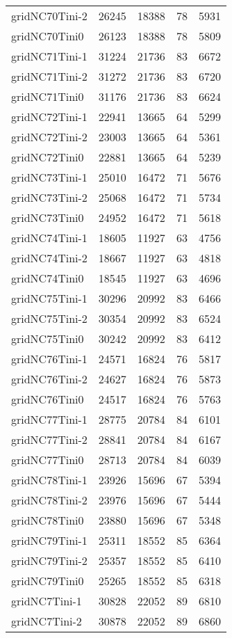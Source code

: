 \begin{longtable}{lrrrr}
gridNC70Tini-2 & 26245 & 18388 & 78 & 5931 \\
gridNC70Tini0 & 26123 & 18388 & 78 & 5809 \\
gridNC71Tini-1 & 31224 & 21736 & 83 & 6672 \\
gridNC71Tini-2 & 31272 & 21736 & 83 & 6720 \\
gridNC71Tini0 & 31176 & 21736 & 83 & 6624 \\
gridNC72Tini-1 & 22941 & 13665 & 64 & 5299 \\
gridNC72Tini-2 & 23003 & 13665 & 64 & 5361 \\
gridNC72Tini0 & 22881 & 13665 & 64 & 5239 \\
gridNC73Tini-1 & 25010 & 16472 & 71 & 5676 \\
gridNC73Tini-2 & 25068 & 16472 & 71 & 5734 \\
gridNC73Tini0 & 24952 & 16472 & 71 & 5618 \\
gridNC74Tini-1 & 18605 & 11927 & 63 & 4756 \\
gridNC74Tini-2 & 18667 & 11927 & 63 & 4818 \\
gridNC74Tini0 & 18545 & 11927 & 63 & 4696 \\
gridNC75Tini-1 & 30296 & 20992 & 83 & 6466 \\
gridNC75Tini-2 & 30354 & 20992 & 83 & 6524 \\
gridNC75Tini0 & 30242 & 20992 & 83 & 6412 \\
gridNC76Tini-1 & 24571 & 16824 & 76 & 5817 \\
gridNC76Tini-2 & 24627 & 16824 & 76 & 5873 \\
gridNC76Tini0 & 24517 & 16824 & 76 & 5763 \\
gridNC77Tini-1 & 28775 & 20784 & 84 & 6101 \\
gridNC77Tini-2 & 28841 & 20784 & 84 & 6167 \\
gridNC77Tini0 & 28713 & 20784 & 84 & 6039 \\
gridNC78Tini-1 & 23926 & 15696 & 67 & 5394 \\
gridNC78Tini-2 & 23976 & 15696 & 67 & 5444 \\
gridNC78Tini0 & 23880 & 15696 & 67 & 5348 \\
gridNC79Tini-1 & 25311 & 18552 & 85 & 6364 \\
gridNC79Tini-2 & 25357 & 18552 & 85 & 6410 \\
gridNC79Tini0 & 25265 & 18552 & 85 & 6318 \\
gridNC7Tini-1 & 30828 & 22052 & 89 & 6810 \\
gridNC7Tini-2 & 30878 & 22052 & 89 & 6860 \\

\end{longtable}
